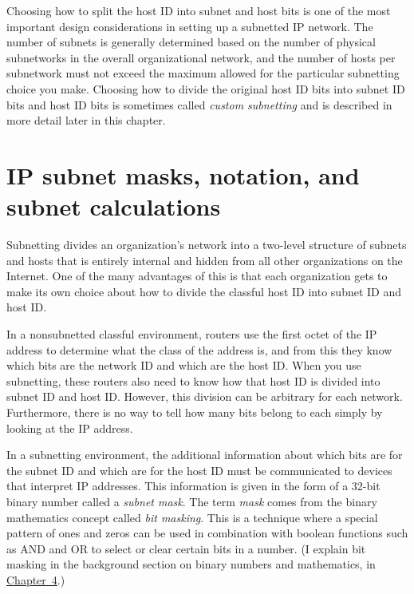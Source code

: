 \documentclass[b5paper,11pt]{memoir}
\begin{document}
Choosing how to split the host ID into subnet and host bits is one of
the most important design considerations in setting up a subnetted IP
network. The number of subnets is generally determined based on the
number of physical subnetworks in the overall organizational network,
and the number of hosts per subnetwork must not exceed the maximum
allowed for the particular subnetting choice you make. Choosing how to
divide the original host ID bits into subnet ID bits and host ID bits is
sometimes called {\emph{custom subnetting}} and is described in more
detail later in this chapter.



\section{IP subnet masks, notation, and subnet calculations}

Subnetting divides an organization's network into a two-level structure of subnets
and hosts that is entirely internal and hidden from all other
organizations on the Internet. One of the many advantages of this is
that each organization gets to make its own choice about how to divide
the classful host ID into subnet ID and host ID.

In a nonsubnetted classful environment, routers use the first octet of
the IP address to determine what the class of the address is, and from
this they know which bits are the network ID and which are the host ID.
When you use subnetting, these routers also need to know how that host
ID is divided into subnet ID and host ID. However, this division can be
arbitrary for each network. Furthermore, there is no way to tell how
many bits belong to each simply by looking at the IP address.

In a subnetting environment, the additional information about which bits
are for the subnet ID and which are for the host ID must be communicated
to devices that interpret IP addresses. This information is given in the
form of a 32-bit binary number called a {\emph{subnet mask}}. The term
{\emph{mask}} comes from the binary mathematics concept called
\protect\hypertarget{ch18s03.htmlux5cux23idx-CHP-18-0721}{}{}{\emph{bit
masking}}. This is a technique where a special pattern of ones and zeros
can be used in combination with boolean functions such as AND and OR to
select or clear certain bits in a number. (I explain bit masking in the
background section on binary numbers and mathematics, in
\protect\hyperlink{ch04.html}{Chapter~4}.)
\end{document}
